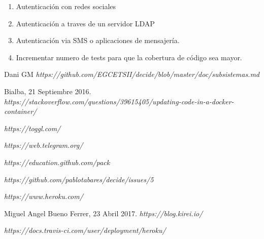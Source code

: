 \documentclass[12pt]{article}
\begin{document}
\begin{enumerate}
\item Autenticación con redes sociales
\item Autenticación a traves de un servidor LDAP
\item Autenticación via SMS o aplicaciones de mensajería.
\item Incrementar numero de tests para que la cobertura de código sea mayor.
\end{enumerate}

\newpage	


\begin{thebibliography}{9}
Dani GM
\textit
{https://github.com/EGCETSII/decide/blob/master/doc/subsistemas.md}

Bialba, 21 Septiembre 2016. 
\textit{https://stackoverflow.com/questions/39615405/updating-code-in-a-docker-container/}

\textit{https://toggl.com/}

\textit{https://web.telegram.org/}

\textit{https://education.github.com/pack}

\textit{https://github.com/pablotabares/decide/issues/5}

\textit{https://www.heroku.com/}

Miguel Angel Bueno Ferrer, 23 Abril 2017. 
\textit{https://blog.kirei.io/}

\textit{https://docs.travis-ci.com/user/deployment/heroku/}




\end{thebibliography}
\end{document}
